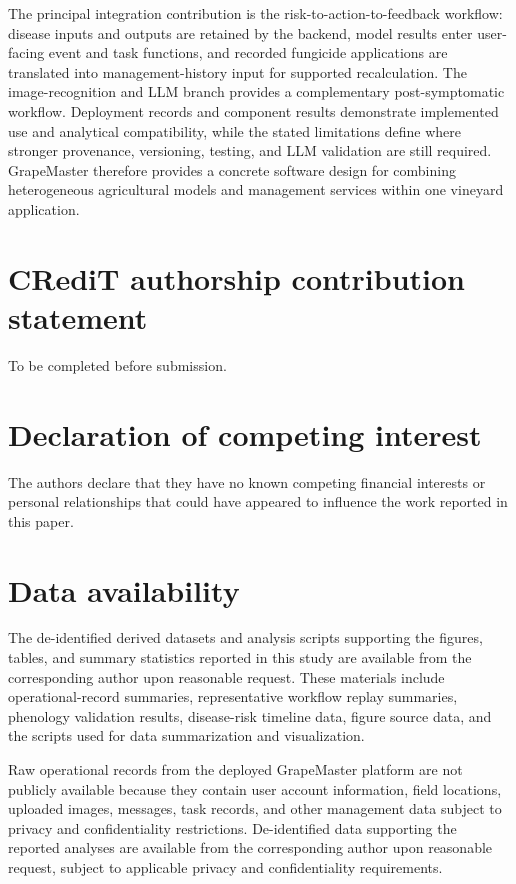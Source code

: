 \documentclass[12pt]{article}
\begin{document}
The principal integration contribution is the risk-to-action-to-feedback workflow: disease inputs and outputs are retained by the backend, model results enter user-facing event and task functions, and recorded fungicide applications are translated into management-history input for supported recalculation. The image-recognition and LLM branch provides a complementary post-symptomatic workflow. Deployment records and component results demonstrate implemented use and analytical compatibility, while the stated limitations define where stronger provenance, versioning, testing, and LLM validation are still required. GrapeMaster therefore provides a concrete software design for combining heterogeneous agricultural models and management services within one vineyard application.

\section*{CRediT authorship contribution statement}

To be completed before submission.

\section*{Declaration of competing interest}

The authors declare that they have no known competing financial interests or personal relationships that could have appeared to influence the work reported in this paper.

\section*{Data availability}

The de-identified derived datasets and analysis scripts supporting the figures, tables, and summary statistics reported in this study are available from the corresponding author upon reasonable request. These materials include operational-record summaries, representative workflow replay summaries, phenology validation results, disease-risk timeline data, figure source data, and the scripts used for data summarization and visualization.

Raw operational records from the deployed GrapeMaster platform are not publicly available because they contain user account information, field locations, uploaded images, messages, task records, and other management data subject to privacy and confidentiality restrictions. De-identified data supporting the reported analyses are available from the corresponding author upon reasonable request, subject to applicable privacy and confidentiality requirements.
\end{document}
